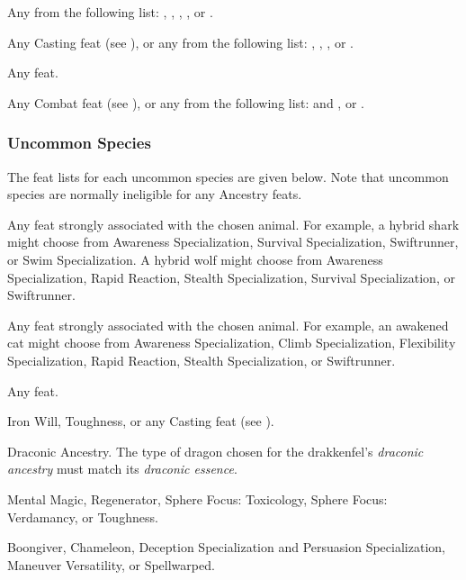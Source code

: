      Any from the following list: , , , , or .

     Any Casting feat (see ), or any from the following list: , , , or .

     Any feat.

     Any Combat feat (see ), or any from the following list:  and , or .

    \subsubsection{Uncommon Species}
      The feat lists for each uncommon species are given below.
      Note that uncommon species are normally ineligible for any Ancestry feats.

       Any feat strongly associated with the chosen animal. For example, a hybrid shark might choose from Awareness Specialization, Survival Specialization, Swiftrunner, or Swim Specialization. A hybrid wolf might choose from Awareness Specialization, Rapid Reaction, Stealth Specialization, Survival Specialization, or Swiftrunner.

       Any feat strongly associated with the chosen animal. For example, an awakened cat might choose from Awareness Specialization, Climb Specialization, Flexibility Specialization, Rapid Reaction, Stealth Specialization, or Swiftrunner.

       Any feat.

       Iron Will, Toughness, or any Casting feat (see ).

       Draconic Ancestry. The type of dragon chosen for the drakkenfel's \textit{draconic ancestry} must match its \textit{draconic essence}.

       Mental Magic, Regenerator, Sphere Focus: Toxicology, Sphere Focus: Verdamancy, or Toughness.

       Boongiver, Chameleon, Deception Specialization and Persuasion Specialization, Maneuver Versatility, or Spellwarped.

